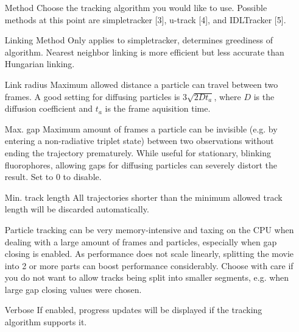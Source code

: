 \documentclass[11pt,onside]{report}
\makeatletter
\numberwithin{equation}{chapter}
\gdef\tshortstack{\@ifnextchar[\@tshortstack{\@tshortstack[c]}}
\gdef\@tshortstack[#1]{%
  \leavevmode
  \vtop\bgroup
    \baselineskip-\p@\lineskip 3\p@
    \let\mb@l\hss\let\mb@r\hss
    \expandafter\let\csname mb@#1\endcsname\relax
    \let\\\@stackcr
    \@ishortstack}
\makeatother
\begin{document}
\begin{itemize}[leftmargin=2cm]
\item[Method] Choose the tracking algorithm you would like to use. Possible methods at this point are \textsf{simpletracker} [3], \textsf{u-track} [4], and \textsf{IDLTracker} [5].
\item [Linking Method] Only applies to simpletracker, determines greediness of algorithm. Nearest neighbor linking is more efficient but less accurate than Hungarian linking.
\item [Link radius] Maximum allowed distance a particle can travel between two frames. A good setting for diffusing particles is $3\sqrt{2 D t_a}$, where $D$ is the diffusion coefficient and $t_a$ is the frame aquisition time.
\item [Max. gap] Maximum amount of frames a particle can be invisible (e.g. by entering a non-radiative triplet state) between two observations without ending the trajectory prematurely. While useful for stationary, blinking fluorophores, allowing gaps for diffusing particles can severely distort the result. Set to 0 to disable.
\item [Min. track length] All trajectories shorter than the minimum allowed track length will be discarded automatically. 
\item [\smash{\tshortstack[1]{Split movie\\into parts}}] Particle tracking can be very memory-intensive and taxing on the CPU when dealing with a large amount of frames and particles, especially when gap closing is enabled. As performance does not scale linearly, splitting the movie into 2 or more parts can boost performance considerably. Choose with care if you do not want to allow tracks being split into smaller segments, e.g. when large gap closing values were chosen.
\item [Verbose] If enabled, progress updates will be displayed if the tracking algorithm supports it.
\end{itemize}
\end{document}
